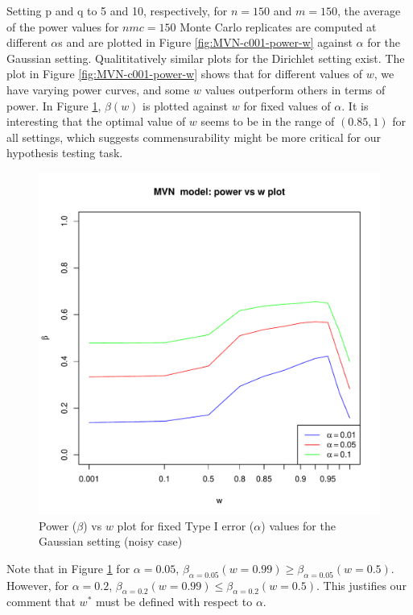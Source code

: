 \documentclass[11pt]{article} %
\begin{document}
Setting p and q to 5 and 10, respectively, for $n=150$ and $m=150$, the average of the power values for $nmc=150$ Monte Carlo replicates are computed at  different $\alpha$s and are plotted in Figure \ref{fig:MVN-c001-power-w} against $\alpha$ for the Gaussian setting.  Qualititatively similar plots for the Dirichlet setting  exist.  The plot in Figure \ref{fig:MVN-c001-power-w} shows that for different values of  $w$, we have varying power curves, and some $w$ values outperform others in terms of power. In Figure \ref{fig:MVN-c001-beta-w},  $\beta(w)$ is plotted against $w$ for fixed values of $\alpha$. It is  interesting that the optimal value of $w$ seems to be in the range of $(0.85,1)$ for all settings, which suggests commensurability might be more critical for our hypothesis testing task. 

\begin{figure}
\includegraphics[scale=0.65]{OOSMVN-power-w-c001.pdf}
\caption{Power ($\beta$) vs $w$ plot for fixed Type I error ($\alpha$) values for the Gaussian setting (noisy case)}
\label{fig:MVN-c001-beta-w}
\end{figure}
Note that in Figure \ref{fig:MVN-c001-beta-w} for $\alpha=0.05$, $\beta_{\alpha=0.05}(w=0.99)\geq\beta_{\alpha=0.05}(w=0.5)$. However, for $\alpha=0.2$, $\beta_{\alpha=0.2}(w=0.99)\leq\beta_{\alpha=0.2}(w=0.5)$. This justifies our comment that  $w^{*}$  must be defined with respect to $\alpha$.
\end{document}
